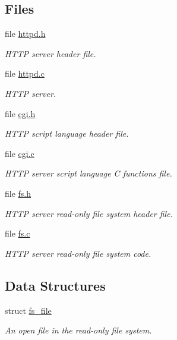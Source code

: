 \subsection*{Files}
\begin{CompactItemize}
\item 
file \hyperlink{a00038}{httpd.h}
\begin{CompactList}\small\item\em HTTP server header file. \item\end{CompactList}

\item 
file \hyperlink{a00037}{httpd.c}
\begin{CompactList}\small\item\em HTTP server. \item\end{CompactList}

\item 
file \hyperlink{a00034}{cgi.h}
\begin{CompactList}\small\item\em HTTP script language header file. \item\end{CompactList}

\item 
file \hyperlink{a00033}{cgi.c}
\begin{CompactList}\small\item\em HTTP server script language C functions file. \item\end{CompactList}

\item 
file \hyperlink{a00036}{fs.h}
\begin{CompactList}\small\item\em HTTP server read-only file system header file. \item\end{CompactList}

\item 
file \hyperlink{a00035}{fs.c}
\begin{CompactList}\small\item\em HTTP server read-only file system code. \item\end{CompactList}

\end{CompactItemize}
\subsection*{Data Structures}
\begin{CompactItemize}
\item 
struct \hyperlink{a00026}{fs\_\-file}
\begin{CompactList}\small\item\em An open file in the read-only file system. \item\end{CompactList}\end{CompactItemize}
